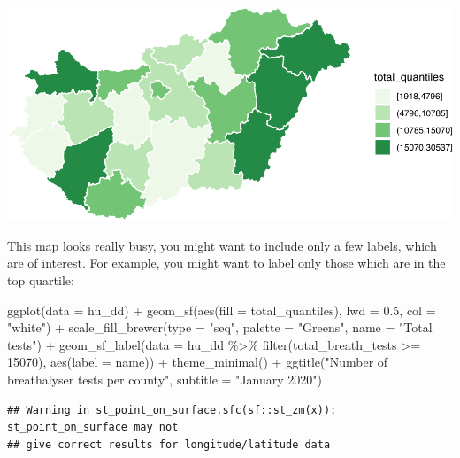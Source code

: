 \documentclass[
]{book}
\newenvironment{Shaded}{\begin{snugshade}}{\end{snugshade}}
\newcommand{\AttributeTok}[1]{\textcolor[rgb]{0.77,0.63,0.00}{#1}}
\newcommand{\DecValTok}[1]{\textcolor[rgb]{0.00,0.00,0.81}{#1}}
\newcommand{\FloatTok}[1]{\textcolor[rgb]{0.00,0.00,0.81}{#1}}
\newcommand{\FunctionTok}[1]{\textcolor[rgb]{0.00,0.00,0.00}{#1}}
\newcommand{\NormalTok}[1]{#1}
\newcommand{\SpecialCharTok}[1]{\textcolor[rgb]{0.00,0.00,0.00}{#1}}
\newcommand{\StringTok}[1]{\textcolor[rgb]{0.31,0.60,0.02}{#1}}
\begin{document}
\includegraphics{crime_mapping_files/figure-latex/unnamed-chunk-159-1.pdf}

This map looks really busy, you might want to include only a few labels, which are of interest. For example, you might want to label only those which are in the top quartile:

\begin{Shaded}
\begin{Highlighting}[]
\FunctionTok{ggplot}\NormalTok{(}\AttributeTok{data =}\NormalTok{ hu\_dd) }\SpecialCharTok{+} 
  \FunctionTok{geom\_sf}\NormalTok{(}\FunctionTok{aes}\NormalTok{(}\AttributeTok{fill =}\NormalTok{ total\_quantiles), }\AttributeTok{lwd =} \FloatTok{0.5}\NormalTok{, }\AttributeTok{col =} \StringTok{"white"}\NormalTok{) }\SpecialCharTok{+} 
  \FunctionTok{scale\_fill\_brewer}\NormalTok{(}\AttributeTok{type =} \StringTok{"seq"}\NormalTok{, }\AttributeTok{palette =} \StringTok{"Greens"}\NormalTok{, }\AttributeTok{name =} \StringTok{"Total tests"}\NormalTok{) }\SpecialCharTok{+} 
  \FunctionTok{geom\_sf\_label}\NormalTok{(}\AttributeTok{data =}\NormalTok{ hu\_dd }\SpecialCharTok{\%\textgreater{}\%} \FunctionTok{filter}\NormalTok{(total\_breath\_tests }\SpecialCharTok{\textgreater{}=} \DecValTok{15070}\NormalTok{), }\FunctionTok{aes}\NormalTok{(}\AttributeTok{label =}\NormalTok{ name)) }\SpecialCharTok{+} 
  \FunctionTok{theme\_minimal}\NormalTok{() }\SpecialCharTok{+} 
  \FunctionTok{ggtitle}\NormalTok{(}\StringTok{"Number of breathalyser tests per county"}\NormalTok{, }\AttributeTok{subtitle =} \StringTok{"January 2020"}\NormalTok{)}
\end{Highlighting}
\end{Shaded}

\begin{verbatim}
## Warning in st_point_on_surface.sfc(sf::st_zm(x)): st_point_on_surface may not
## give correct results for longitude/latitude data
\end{verbatim}
\end{document}
